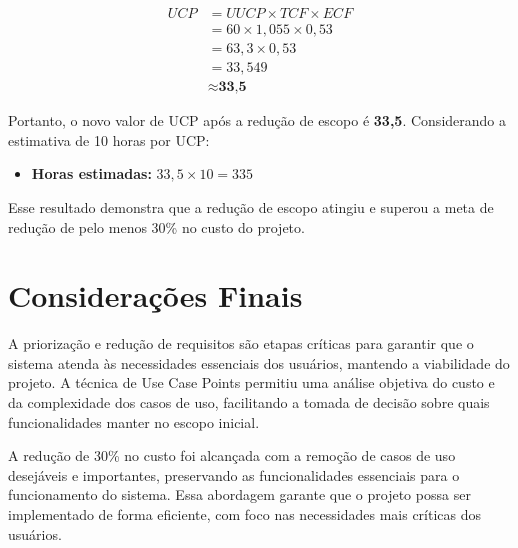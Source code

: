 \begin{align*}
    UCP &= UUCP \times TCF \times ECF \\
    &= 60 \times 1,055 \times 0,53 \\
    &= 63,3 \times 0,53 \\
    &= 33,549 \\
    &\approx \textbf{33,5}
\end{align*}

Portanto, o novo valor de UCP após a redução de escopo é \textbf{33,5}. Considerando a estimativa de 10 horas por UCP:

\begin{itemize}
    \item \textbf{Horas estimadas:} $33,5 \times 10 = 335$
\end{itemize}

Esse resultado demonstra que a redução de escopo atingiu e superou a meta de redução de pelo menos 30\% no custo do projeto.

\section{Considerações Finais}

A priorização e redução de requisitos são etapas críticas para garantir que o sistema atenda às necessidades essenciais dos usuários, mantendo a viabilidade do projeto. A técnica de Use Case Points permitiu uma análise objetiva do custo e da complexidade dos casos de uso, facilitando a tomada de decisão sobre quais funcionalidades manter no escopo inicial.

A redução de 30\% no custo foi alcançada com a remoção de casos de uso desejáveis e importantes, preservando as funcionalidades essenciais para o funcionamento do sistema. Essa abordagem garante que o projeto possa ser implementado de forma eficiente, com foco nas necessidades mais críticas dos usuários.